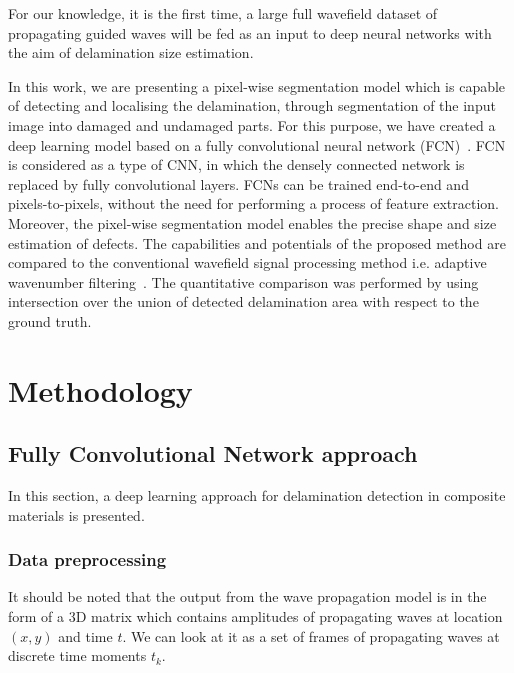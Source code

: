 \documentclass[preprint,9pt]{elsarticle}
\begin{document}
For our knowledge, it is the first time, a large full wavefield dataset of propagating guided waves will be fed as an input to deep neural networks with the aim of delamination size estimation.

In this work, we are presenting a pixel-wise segmentation model which is capable of detecting and localising the delamination, through segmentation of the input image into damaged and undamaged parts.
For this purpose, we have created a deep learning model based on a fully convolutional neural network (FCN)~\cite{long2015fully}.
FCN is considered as a type of CNN, in which the densely connected network is replaced by fully convolutional layers. 
FCNs can be trained end-to-end and pixels-to-pixels, without the need for performing a process of feature extraction. 
Moreover, the pixel-wise segmentation model enables the precise shape and size estimation of defects.
The capabilities and potentials of the proposed method are compared to the conventional wavefield signal processing method i.e. adaptive wavenumber filtering~\cite{Kudela2015,Radzienski2019}.
The quantitative comparison was performed by using intersection over the union of detected delamination area with respect to the ground truth. 
\section{Methodology}



\subsection{Fully Convolutional Network approach}
In this section, a deep learning approach for delamination detection in composite materials is presented. 
\subsubsection{Data preprocessing}
It should be noted that the output from the wave propagation model is in the form of a 3D matrix which contains amplitudes of propagating waves at location \((x, y)\) and time \(t\). We can look at it as a set of frames of propagating waves at discrete time moments \(t_k\).
\end{document}
